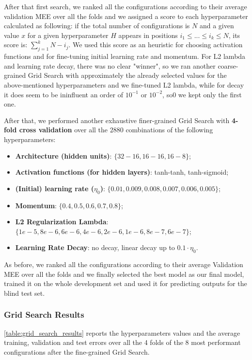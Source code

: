 After that first search, we ranked all the configurations according to their average validation MEE over all the folds and we assigned a score to each hyperparameter calculated as following: if the total number of configurations is $N$ and a given value $x$ for a given hyperparameter $H$ appears in positions $i_1 \leq ... \leq i_k \leq N$, its score is: $\sum_{j=1}^{k}{N - i_j}$. We used this score as an heuristic for choosing activation functions and for fine-tuning initial learning rate and momentum. For L2 lambda and learning rate decay, there was no clear "winner", so we ran another coarse-grained Grid Search with approximately the already selected values for the above-mentioned hyperparameters and we fine-tuned L2 lambda, while for decay it does seem to be ininfluent an order of $10^{-1}$ or $10^{-2}$, so0 we kept only the first one.

After that, we performed another exhaustive finer-grained Grid Search with \textbf{4-fold cross validation} over all the $2880$ combinations of the following hyperparameters:
\begin{itemize}
    \item \textbf{Architecture (hidden units)}: $\{32-16, 16-16, 16-8\}$;
    \item \textbf{Activation functions (for hidden layers)}: {tanh-tanh, tanh-sigmoid};
    \item \textbf{(Initial) learning rate ($\eta_0$)}: $\{0.01, 0.009, 0.008, 0.007, 0.006, 0.005\}$;
    \item \textbf{Momentum}: $\{0.4, 0.5, 0.6, 0.7, 0.8\}$;
    \item \textbf{L2 Regularization Lambda}: $\{1e-5, 8e-6, 6e-6, 4e-6, 2e-6, 1e-6, 8e-7, 6e-7\}$;
    \item \textbf{Learning Rate Decay}: {no decay, linear decay up to $0.1 \cdot \eta_0$}.
\end{itemize}
As before, we ranked all the configurations according to their average Validation MEE over all the folds and we finally selected the best model as our final model, trained it on the whole development set and used it for predicting outputs for the blind test set.

\subsubsection{Grid Search Results}
\cref{table:grid_search_results} reports the hyperparameters values and the average training, validation and test errors over all the 4 folds of the 8 most performant configurations after the fine-grained Grid Search.

